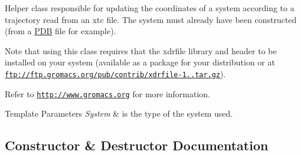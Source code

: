 Helper class responsible for updating the coordinates of a system according to a trajectory read from an xtc file. The system must already have been constructed (from a \hyperlink{namespaceESBTL_1_1PDB}{P\+DB} file for example).

Note that using this class requires that the xdrfile library and header to be installed on your system (available as a package for your distribution or at \href{ftp://ftp.gromacs.org/pub/contrib/xdrfile-1.1.tar.gz}{\tt ftp\+://ftp.\+gromacs.\+org/pub/contrib/xdrfile-\/1..\+tar.\+gz}).

Refer to \href{http://www.gromacs.org}{\tt http\+://www.\+gromacs.\+org} for more information. 
\begin{DoxyTemplParams}{Template Parameters}
{\em System} & is the type of the system used. \\
\hline
\end{DoxyTemplParams}


\subsection{Constructor \& Destructor Documentation}
\mbox{\label{classESBTL_1_1System__updater__from__xdrfile_ab8ec6b14664c00a39bc8878c54514307}} 
